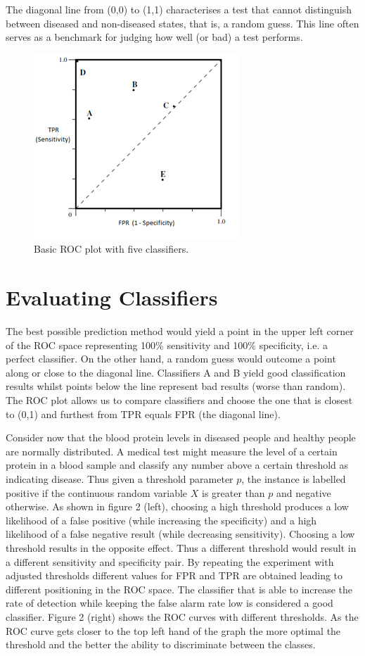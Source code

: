 The diagonal line from (0,0) to (1,1) characterises a test that cannot distinguish between diseased and non-diseased states, that is, a random guess. This line often serves as a benchmark for judging how well (or bad) a test performs.

\begin{figure}
	\includegraphics{roc_curves/Figure1.png}
	\caption{Basic ROC plot with five classifiers.}
	\label{fig:classifiers-roc}
\end{figure}

\section{Evaluating Classifiers} 
The best possible prediction method would yield a point in the upper left corner of the ROC space representing 100\% sensitivity and 100\% specificity, i.e. a perfect classifier. On the other hand, a random guess would outcome a point along or close to the diagonal line. Classifiers A and B yield good classification results whilst points below the line represent bad results (worse than random). The ROC plot allows us to compare classifiers and choose the one that is closest to (0,1) and furthest from TPR equals FPR (the diagonal line).

Consider now that the blood protein levels in diseased people and healthy people are normally distributed. A medical test might measure the level of a certain protein in a blood sample and classify any number above a certain threshold as indicating disease. Thus given a threshold parameter $p$, the instance is labelled positive if the continuous random variable $X$ is greater than $p$ and negative otherwise. As shown in figure 2 (left), choosing a high threshold produces a low likelihood of a false positive (while increasing the specificity) and a high likelihood of a false negative result (while decreasing sensitivity). Choosing a low threshold results in the opposite effect. Thus a different threshold would result in a different sensitivity and specificity pair. By repeating the experiment with adjusted thresholds different values for FPR and TPR are obtained leading to different positioning in the ROC space. The classifier that is able to increase the rate of detection while keeping the false alarm rate low is considered a good classifier. Figure 2 (right) shows the ROC curves with different thresholds. As the ROC curve gets closer to the top left hand of the graph the more optimal the threshold and the better the ability to discriminate between the classes.

